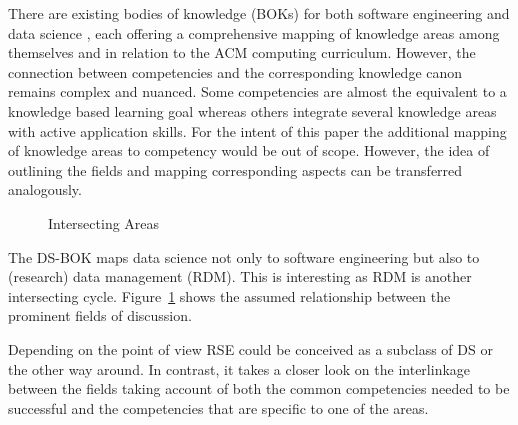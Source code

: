 \documentclass[
        english,biblatex
    ]{lni}
\begin{document}
    There are existing bodies of knowledge (BOKs) for both software
    engineering \autocite{SWEBOK2014} and data science
    \autocite{DSBOK2017}, each offering a comprehensive mapping of
    knowledge areas among themselves and in relation to the ACM
    computing curriculum. However, the connection between competencies
    and the corresponding knowledge canon remains complex and nuanced.
    Some competencies are almost the equivalent to a knowledge based
    learning goal whereas others integrate several knowledge areas with
    active application skills. For the intent of this paper the
    additional mapping of knowledge areas to competency would be out of
    scope. However, the idea of outlining the fields and mapping
    corresponding aspects can be transferred analogously.

    \begin{figure}


    \caption{\label{fig-cycles}Intersecting Areas}

    \end{figure}%

    The DS-BOK maps data science not only to software engineering but
    also to (research) data management (RDM). This is interesting as RDM
    is another intersecting cycle. Figure~\ref{fig-cycles} shows the
    assumed relationship between the prominent fields of discussion.

    Depending on the point of view RSE could be conceived as a subclass
    of DS or the other way around. In contrast, it takes a closer look
    on the interlinkage between the fields taking account of both the
    common competencies needed to be successful and the competencies
    that are specific to one of the areas.
\end{document}
